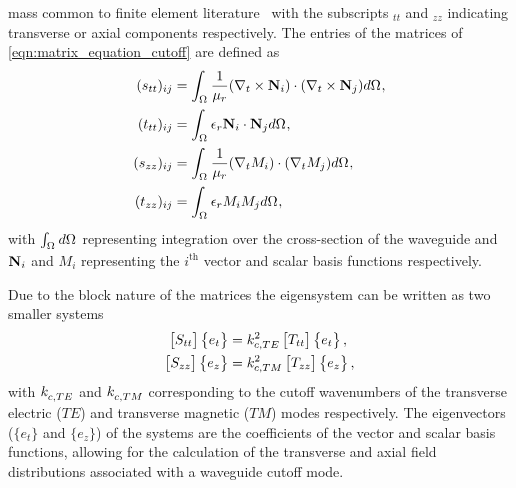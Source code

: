 mass common to finite element literature~\cite{Dav2005, Jin2002} with
the subscripts $_{tt}$ and $_{zz}$ indicating transverse or axial
components respectively.  The entries of the matrices of
\eqref{eqn:matrix_equation_cutoff} are defined as
\begin{align}
\label{eqn:s_tt_ij}
(s_{tt})_{ij} &= \intoverdomain{\inv{\ur}(\curl{\field{N}_i}{t})\cdot(\curl{\field{N}_j}{t})}{\Domain{}},\\
\label{eqn:t_tt_ij}
(t_{tt})_{ij} &= \intoverdomain{\er\field{N}_i\cdot\field{N}_j}{\Domain{}},\\
\label{eqn:s_zz_ij}
(s_{zz})_{ij} &= \intoverdomain{\inv{\ur}(\del{M_i}{t})\cdot(\del{M_j}{t})}{\Domain{}},\\
\label{eqn:t_zz_ij}
(t_{zz})_{ij} &= \intoverdomain{\er M_i M_j}{\Domain{}},
\end{align}
with $\int_{\Omega_{}}{}{d\Omega_{}}$ representing integration over the
cross-section of the waveguide and $\mathbf{N}_i$ and $M_i$
representing the $i^{\text{th}}$ vector and scalar basis functions
respectively.

Due to the block nature of the matrices the eigensystem can be written
as two smaller systems
\begin{align}
    \begin{bmatrix}S_{tt}\end{bmatrix}\begin{Bmatrix}e_t\end{Bmatrix} &=
    k_{c,TE}^{2}\begin{bmatrix}
    T_{tt}\end{bmatrix}\begin{Bmatrix}e_t\end{Bmatrix},\\
    \begin{bmatrix}S_{zz}\end{bmatrix}\begin{Bmatrix}e_z\end{Bmatrix} &= k_{c,TM}^{2}\begin{bmatrix}T_{zz}\end{bmatrix}\begin{Bmatrix}e_z\end{Bmatrix},
\end{align}
with $k_{c,TE}^{}$ and $k_{c,TM}^{}$ corresponding to the cutoff
wavenumbers of the transverse electric ($TE$)
and transverse magnetic ($TM$) modes respectively. The eigenvectors
($\{e_t\}$ and $\{e_z\}$) of the systems are the coefficients of the
vector and scalar basis functions, allowing for the calculation of the
transverse and axial field distributions associated with a waveguide
cutoff mode.

